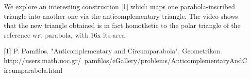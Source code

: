 We explore an interesting construction [1] which maps one parabola-inscribed triangle into another one via the anticomplementary triangle. The video shows that the new triangle obtained is in fact homothetic to the polar triangle of the reference wrt parabola, with 16x its area.

[1] P. Pamfilos, "Anticomplementary and Circumparabola", Geometrikon. http://users.math.uoc.gr/~pamfilos/eGallery/problems/AnticomplementaryAndCircumparabola.html
